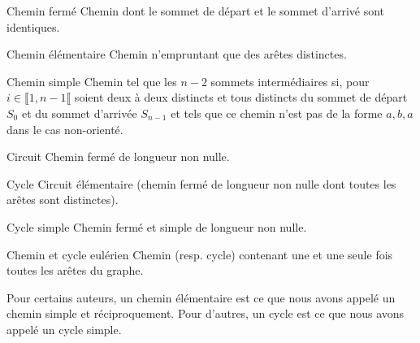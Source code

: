 \begin{defi}{Chemin fermé}
Chemin dont le sommet de départ et le sommet d'arrivé sont identiques.
\end{defi}

\begin{defi}{Chemin élémentaire}
Chemin n'empruntant que des arêtes distinctes.
\end{defi}

\begin{defi}{Chemin simple}
Chemin tel que les $n - 2$ sommets intermédiaires si, pour $i \in \llbracket 1, n-1\llbracket$ soient
deux à deux distincts et tous distincts du sommet de départ $S_0$ et du sommet d’arrivée $S_{n-1}$ et tels
que ce chemin n’est pas de la forme $a, b, a$ dans le cas non-orienté.
\end{defi}

\begin{defi}{Circuit}
Chemin fermé de longueur non nulle.
\end{defi}


\begin{defi}{Cycle}
Circuit élémentaire (chemin fermé de longueur non nulle dont toutes les arêtes sont distinctes).
\end{defi}

\begin{defi}{Cycle simple} 
Chemin fermé et simple de longueur non nulle.
\end{defi}

\begin{defi}{Chemin et cycle eulérien}
Chemin (resp. cycle) contenant une et une seule fois toutes les arêtes du graphe.
\end{defi}

\begin{rem}
Pour certains auteurs, un chemin élémentaire est ce que nous avons appelé un chemin simple et réciproquement. Pour d’autres, un cycle est ce que nous avons appelé un cycle simple.
\end{rem}


